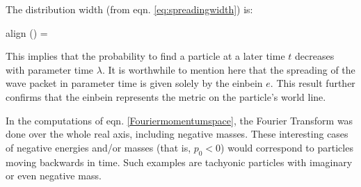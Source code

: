 \documentclass[twoside,a4paper,11pt]{article}
\numberwithin{equation}{section}
\newcommand{\boxedeq}[2]{\begin{empheq}[box={\fboxsep=6pt\fbox}]{align}\label{#1}#2\end{empheq}}
\begin{document}
The distribution width (from eqn. \ref{eq:spreadingwidth}) is:
\boxedeq{eq:timegaussianwavepacket}{
    \sigma(\lambda) = \sqrt{\frac{1}{ \alpha} \left( \alpha^2 + e^2 \lambda^2\right)}
}

This implies that the probability to find a particle at a later time $t$ decreases with parameter time $\lambda$. It is worthwhile to mention here that the spreading of the wave packet in parameter time is given solely by the einbein $e$. This result further confirms that the einbein represents the metric on the particle's world line.

In the computations of eqn. \ref{Fouriermomentumspace}, the Fourier Transform was done over the whole real axis, including negative masses. These interesting cases of negative energies and/or masses (that is, $p_0 <0$) would correspond to particles moving backwards in time. Such examples are tachyonic particles with imaginary or even negative mass. 
\end{document}
